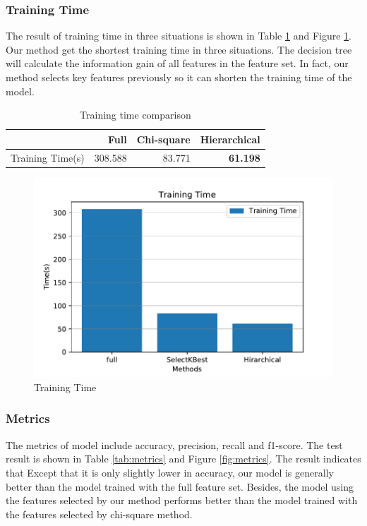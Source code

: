 \documentclass[journal]{IEEEtran}
\begin{document}
\subsubsection{Training Time}

The result of training time in three situations is shown in Table \ref{tab:time} and Figure \ref{fig:training-time}. Our method get the shortest training time in three situations. The decision tree will calculate the information gain of all features in the feature set. In fact, our method selects key features previously so it can shorten the training time of the model. 

\begin{table}[!htpb]
    \caption{Training time comparison}
    \label{tab:time}
    \centering
    \begin{tabular}{crrr}
    \toprule
        & Full & Chi-square & Hierarchical \\
    \midrule
    Training Time(s) & 308.588 & 83.771 & \textbf{61.198} \\
    \bottomrule
    \end{tabular}
\end{table}

\begin{figure}[!htbp]
    \centering
    \includegraphics[scale=0.5]{fig/Training-Time.pdf}
    \caption{Training Time}
    \label{fig:training-time}
\end{figure}

\subsubsection{Metrics}

The metrics of model include accuracy, precision, recall and f1-score. The test result is shown in Table \ref{tab:metrics} and Figure \ref{fig:metrics}. The result indicates that Except that it is only slightly lower in accuracy, our model is generally better than the model trained with the full feature set. Besides, the model using the features selected by our method performs better than the model trained with the features selected by chi-square method.
\end{document}

